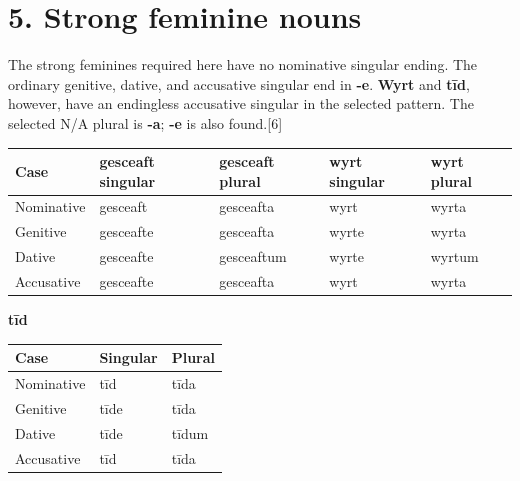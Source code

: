 \section*{5. Strong feminine nouns}

The strong feminines required here have no nominative singular ending. The ordinary genitive, dative, and accusative singular end in \textbf{-e}. \textbf{Wyrt} and \textbf{tīd}, however, have an endingless accusative singular in the selected pattern. The selected N/\allowbreak{}A plural is \textbf{-a}; \textbf{-e} is also found.[6]

\par\begingroup
\fontsize{10.5}{13.2}\selectfont
\setlength{\LTleft}{0pt}\setlength{\LTright}{\fill}
\noindent
\begin{tabular}{@{}>{\raggedright\arraybackslash}p{22.0mm}>{\raggedright\arraybackslash}p{22.688mm}>{\raggedright\arraybackslash}p{22.688mm}>{\raggedright\arraybackslash}p{22.688mm}>{\raggedright\arraybackslash}p{22.688mm}@{}}
\toprule
\textbf{Case} & \textbf{gesceaft singular} & \textbf{gesceaft plural} & \textbf{wyrt singular} & \textbf{wyrt plural} \\
\midrule
Nominative & gesceaft & gesceafta & wyrt & wyrta \\
Genitive & gesceafte & gesceafta & wyrte & wyrta \\
Dative & gesceafte & gesceaftum & wyrte & wyrtum \\
Accusative & gesceafte & gesceafta & wyrt & wyrta \\
\bottomrule
\end{tabular}
\par\endgroup

\textbf{tīd}\par\nobreak

\par\begingroup
\fontsize{10.5}{13.2}\selectfont
\setlength{\LTleft}{0pt}\setlength{\LTright}{\fill}
\noindent
\begin{tabular}{@{}>{\raggedright\arraybackslash}p{39.459mm}>{\raggedright\arraybackslash}p{39.459mm}>{\raggedright\arraybackslash}p{39.459mm}@{}}
\toprule
\textbf{Case} & \textbf{Singular} & \textbf{Plural} \\
\midrule
Nominative & tīd & tīda \\
Genitive & tīde & tīda \\
Dative & tīde & tīdum \\
Accusative & tīd & tīda \\
\bottomrule
\end{tabular}
\par\endgroup

